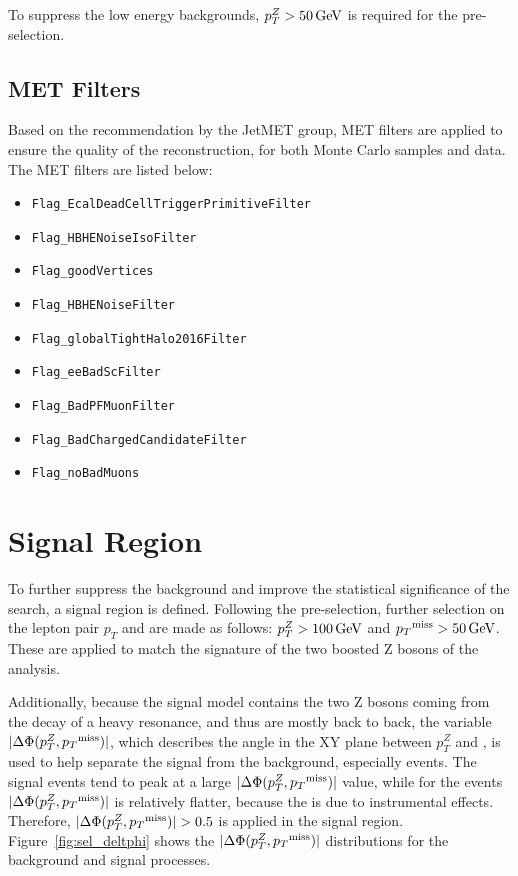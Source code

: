\vspace{0.3cm}
To suppress the low energy backgrounds, $p_T ^Z > 50\,\text{Ge\hspace{-.08em}V}$ is required for the pre-selection.


\subsection{MET Filters}\label{sec:metfilter}
Based on the recommendation by the JetMET group, MET filters are applied to ensure the quality of the \ptmiss reconstruction, for both Monte Carlo samples and data. The MET filters are listed below:
\begin{itemize}
\item \texttt{Flag\_EcalDeadCellTriggerPrimitiveFilter}
\item \texttt{Flag\_HBHENoiseIsoFilter}
\item \texttt{Flag\_goodVertices}
\item \texttt{Flag\_HBHENoiseFilter}
\item \texttt{Flag\_globalTightHalo2016Filter}
\item \texttt{Flag\_eeBadScFilter}
\item \texttt{Flag\_BadPFMuonFilter}
\item \texttt{Flag\_BadChargedCandidateFilter}
\item \texttt{Flag\_noBadMuons}
\end{itemize} 


\section{Signal Region}\label{sec:selection_sr}
To further suppress the background and improve the statistical significance of the search, a signal region is defined. Following the pre-selection, further selection on the lepton pair $p_T$ and \ptmiss are made as follows: $p_T ^Z > 100\,\text{Ge\hspace{-.08em}V}$ and ${p_T}^\text{miss} > 50\,\text{Ge\hspace{-.08em}V}$. These are applied to match the signature of the two boosted Z bosons of the analysis. 

\vspace{0.3cm}
Additionally, because the signal model contains the two Z bosons coming from the decay of a heavy resonance, and thus are mostly back to back, the variable $|\Delta \Phi (p_T ^Z ,{p_T}^\text{miss})|$, which describes the angle in the XY plane between $p_T ^Z$ and \ptmiss, is used to help separate the signal from the background, especially \Zjets events. The signal events tend to peak at a large $|\Delta \Phi (p_T ^Z ,{p_T}^\text{miss})|$ value, while for the \Zjets events $|\Delta \Phi (p_T ^Z ,{p_T}^\text{miss})|$ is relatively flatter, because the \ptmiss is due to instrumental effects. Therefore, $|\Delta \Phi (p_T ^Z ,\ptmiss)|>0.5$ is applied in the signal region. Figure~\ref{fig:sel_deltphi} shows the $|\Delta \Phi (p_T ^Z ,{p_T}^\text{miss})|$ distributions for the background and signal processes.

